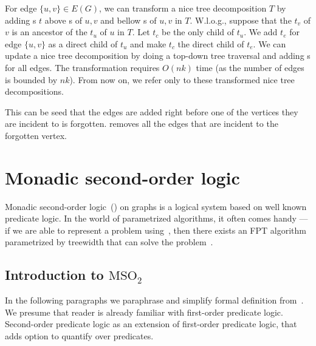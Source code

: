 For edge \( \{u, v\} \in E(G) \), we can transform a nice tree decomposition \( T \)
by adding \IntroduceEdgeNode{}s \( t \) above \IntroduceVertexNode{}s of \( u, v \)
and bellow \ForgetVertexNode{}s of \( u, v \) in \( T \).
%
W.l.o.g., suppose that the \ForgetVertexNode{} \( t_v \) of \( v \) is
an ancestor of the \ForgetVertexNode{} \( t_u \) of \( u \) in \( T \).
Let \( t_c \) be the only child of \( t_u \).
%
We add \IntroduceEdgeNode{} \( t_e \) for edge \( \{u, v\} \)
as a direct child of \( t_u \) and make \( t_c \) the direct child of \( t_e \).
%
We can update a nice tree decomposition by doing
a top-down tree traversal and adding \IntroduceEdgeNode{}s for all edges.
The transformation requires \( O(nk) \) time (as the number of edges is bounded by \( nk \)).
From now on, we refer only to these transformed nice tree decompositions.

%
%
This can be seed that the edges are added right before one of the vertices
they are incident to is forgotten. \ForgetVertexNode{} removes all the edges
that are incident to the forgotten vertex.


\section{Monadic second-order logic}

Monadic second-order logic~(\MSO{}) on graphs is a logical system based on
well known predicate logic.
In the world of parametrized algorithms,
it often comes handy --- if we are able to represent a problem using~\MSO{},
then there exists an FPT algorithm parametrized by treewidth
that can solve the problem~\cite{tree_width_mso}.

\subsection{Introduction to \( \text{MSO}_2 \)}

In the following paragraphs we paraphrase and simplify formal definition
from~\cite{book_parametrized_algorithms}.
We presume that reader is already familiar with first-order predicate logic.
Second-order predicate logic as an extension of first-order predicate logic,
that adds option to quantify over predicates.

